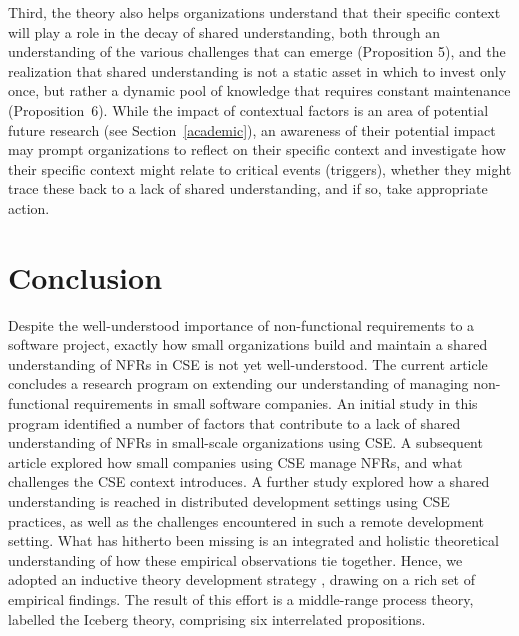 \documentclass[smallextended]{svjour3}        %
\begin{document}
Third, the theory also helps organizations understand that their specific context will play a role in the decay of shared understanding, both through an understanding of the various challenges that can emerge (Proposition 5), and the realization that shared understanding is not a static asset in which to invest only once, but rather a dynamic pool of knowledge that requires constant maintenance (Proposition~6). 
While the impact of contextual factors is an area of potential future research (see Section~\ref{academic}), an awareness of their potential impact may prompt organizations to reflect on their specific context and investigate how their specific context might relate to critical events (triggers), whether they might trace these back to a lack of shared understanding, and if so, take appropriate action.








\section{Conclusion}
\label{sec:conclusion}

Despite the well-understood importance of non-functional requirements to a software project, exactly how small organizations build and maintain a shared understanding of NFRs in CSE is not yet well-understood.
The current article concludes a research program on extending our understanding of managing non-functional requirements in small software companies. An initial study in this program \citep{werner2020re} identified a number of factors that contribute to a lack of shared understanding of NFRs in small-scale organizations using CSE.
A subsequent article \citep{werner_tse_2021} explored how small companies using CSE manage NFRs, and what challenges the CSE context introduces. A further study \citep{okpara_re2022,okpara_rej2023} explored how a shared understanding is reached in distributed development settings using CSE practices, as well as the challenges encountered in such a remote development setting. 
What has hitherto been missing is an integrated and holistic theoretical understanding of how these empirical observations tie together. Hence, we adopted an inductive theory development strategy \citep{stol2018abc}, drawing on a rich set of empirical findings. The result of this effort is a middle-range process theory, labelled the Iceberg theory, comprising six interrelated propositions. 
\end{document}
